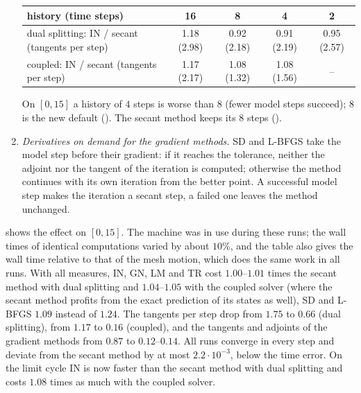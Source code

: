 \documentclass[11pt,a4paper]{article}
\theoremstyle{definition}
\theoremstyle{remark}
\begin{document}
\begin{enumerate}
\begin{center}
\begin{tabular}{lcccc}
\toprule
history (time steps) & 16 & 8 & 4 & 2\\
\midrule
dual splitting: IN / secant (tangents per step) & 1.18 (2.98) & 0.92 (2.18) & 0.91 (2.19) & 0.95 (2.57)\\
coupled: IN / secant (tangents per step) & 1.17 (2.17) & 1.08 (1.32) & 1.08 (1.56) & --\\
\bottomrule
\end{tabular}
\end{center}
On $[0,15]$ a history of $4$ steps is worse than $8$ (fewer model steps succeed); $8$ is the new
default (). The secant method keeps its $8$ steps ().
\item \emph{Derivatives on demand for the gradient methods.} SD and L-BFGS take the model step before
their gradient: if it reaches the tolerance, neither the adjoint nor the tangent of the iteration
is computed; otherwise the method continues with its own iteration from the better point. A
successful model step makes the iteration a secant step, a failed one leaves the method unchanged.
\end{enumerate}
 shows the effect on $[0,15]$. The machine was in use during these runs; the
wall times of identical computations varied by about $10\%$, and the table also gives the wall time
relative to that of the mesh motion, which does the same work in all runs. With all measures, IN,
GN, LM and TR cost $1.00$--$1.01$ times the secant method with dual splitting and $1.04$--$1.05$
with the coupled solver (where the secant method profits from the exact prediction of its states as
well), SD and L-BFGS $1.09$ instead of $1.24$. The tangents per step drop from $1.75$ to $0.66$ (dual
splitting), from $1.17$ to $0.16$ (coupled), and the tangents and adjoints of the gradient methods
from $0.87$ to $0.12$--$0.14$. All runs converge in every step and deviate from the secant method by
at most $2.2\cdot10^{-3}$, below the time error. On the limit cycle IN is now faster than the secant
method with dual splitting and costs $1.08$ times as much with the coupled solver.
\end{document}
